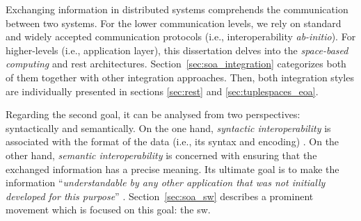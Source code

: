 \medskip

Exchanging information in distributed systems comprehends the communication between two systems.
For the lower communication levels, we rely on standard and widely accepted communication protocols (i.e., interoperability \emph{ab-initio}). %
For higher-levels (i.e., application layer), this dissertation delves into the \emph{space-based computing} and \ac{rest} architectures.
Section~\ref{sec:soa_integration} categorizes both of them together with other integration approaches.
Then, both integration styles are individually presented in sections \ref{sec:rest} and \ref{sec:tuplespaces_eoa}.

\medskip

Regarding the second goal, it can be analysed from two perspectives: syntactically and semantically.
On the one hand, \emph{syntactic interoperability} is associated with the format of the data (i.e., its syntax and encoding) \citep{van_der_veer_achieving_2006}. %
On the other hand, \emph{semantic interoperability} is concerned with ensuring that the exchanged information has a precise meaning.
Its ultimate goal is to make the information ``\emph{understandable by any other application that was not initially developed for this purpose}'' \citep{_european_2004}.
Section~\ref{sec:soa_sw} describes a prominent movement which is focused on this goal: the \acl{sw}. %









